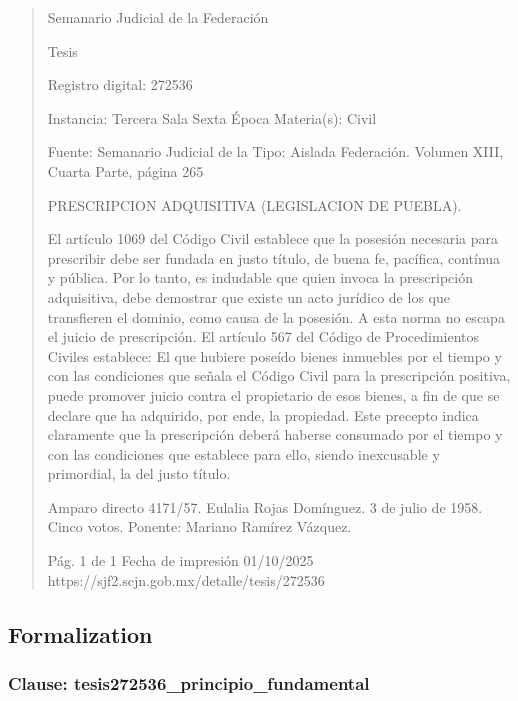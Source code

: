 \documentclass[11pt,a4paper]{article}
\begin{document}
\begin{quote}
                                                   Semanario Judicial de la Federación

                                                  Tesis

 Registro digital: 272536

 Instancia: Tercera Sala          Sexta Época                          Materia(s): Civil

                                  Fuente: Semanario Judicial de la     Tipo: Aislada
                                  Federación.
                                  Volumen XIII, Cuarta Parte, página
                                  265


PRESCRIPCION ADQUISITIVA (LEGISLACION DE PUEBLA).


El artículo 1069 del Código Civil establece que la posesión necesaria para prescribir debe ser
fundada en justo título, de buena fe, pacífica, contínua y pública. Por lo tanto, es indudable que
quien invoca la prescripción adquisitiva, debe demostrar que existe un acto jurídico de los que
transfieren el dominio, como causa de la posesión. A esta norma no escapa el juicio de prescripción.
El artículo 567 del Código de Procedimientos Civiles establece: El que hubiere poseído bienes
inmuebles por el tiempo y con las condiciones que señala el Código Civil para la prescripción
positiva, puede promover juicio contra el propietario de esos bienes, a fin de que se declare que ha
adquirido, por ende, la propiedad. Este precepto indica claramente que la prescripción deberá
haberse consumado por el tiempo y con las condiciones que establece para ello, siendo inexcusable
y primordial, la del justo título.


Amparo directo 4171/57. Eulalia Rojas Domínguez. 3 de julio de 1958. Cinco votos. Ponente:
Mariano Ramírez Vázquez.




                                             Pág. 1 de 1            Fecha de impresión 01/10/2025
  https://sjf2.scjn.gob.mx/detalle/tesis/272536

\end{quote}

\subsection{Formalization}

\subsubsection{Clause: tesis272536\_principio\_fundamental}
\end{document}
